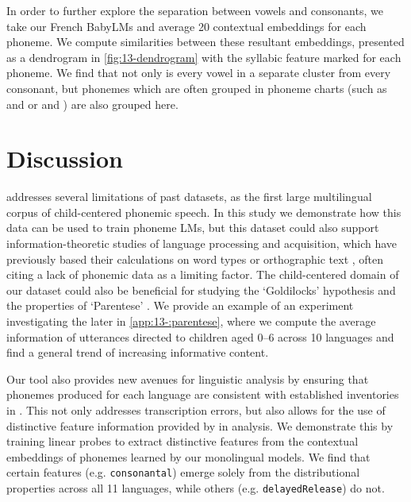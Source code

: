 
In order to further explore the separation between vowels and consonants, we take our French BabyLMs and average 20 contextual embeddings for each phoneme. We compute similarities between these resultant embeddings, presented as a dendrogram in \cref{fig:13-dendrogram} with the syllabic feature marked for each phoneme. We find that not only is every vowel in a separate cluster from every consonant, but phonemes which are often grouped in phoneme charts (such as  and  or  and \ttipa{\textschwa}) are also grouped here.

\section{Discussion}

\ipachildes addresses several limitations of past datasets, as the first large multilingual corpus of child-centered phonemic speech. In this study we demonstrate how this data can be used to train phoneme LMs, but this dataset could also support information-theoretic studies of language processing and acquisition, which have previously based their calculations on word types \citep{piantadosi2011word, dautriche2017words, pimentel2020phonotactic} or orthographic text \citep{mahowald2013info, dautriche2017wordform, futrell2020lossy}, often citing a lack of phonemic data as a limiting factor. %
The child-centered domain of our dataset could also be beneficial for studying the `Goldilocks' hypothesis \citep{kidd2014goldilocks} and the properties of `Parentese' \citep{ramirez2017look}. We provide an example of an experiment investigating the later in \cref{app:13-:parentese}, where we compute the average information of utterances directed to children aged 0--6 across 10 languages and find a general trend of increasing informative content.

Our \corpusphonemizer tool also provides new avenues for linguistic analysis by ensuring that phonemes produced for each language are consistent with established inventories in \phoible. This not only addresses transcription errors, but also allows for the use of distinctive feature information provided by \phoible in analysis. We demonstrate this by training linear probes to extract distinctive features from the contextual embeddings of phonemes learned by our monolingual models. We find that certain features (e.g. \texttt{consonantal}) emerge solely from the distributional properties across all 11 languages, while others (e.g. \texttt{delayedRelease}) do not. 

